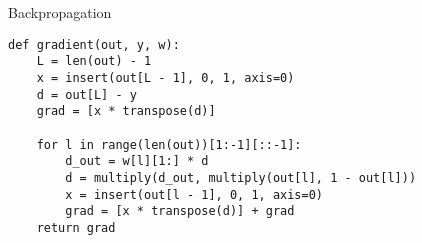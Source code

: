 \begin{frame}[fragile]
  \begin{block}{Backpropagation}
    \begin{lstlisting}
def gradient(out, y, w):
    L = len(out) - 1
    x = insert(out[L - 1], 0, 1, axis=0)
    d = out[L] - y
    grad = [x * transpose(d)]

    for l in range(len(out))[1:-1][::-1]:
        d_out = w[l][1:] * d
        d = multiply(d_out, multiply(out[l], 1 - out[l]))
        x = insert(out[l - 1], 0, 1, axis=0)
        grad = [x * transpose(d)] + grad
    return grad
    \end{lstlisting}
  \end{block}
\end{frame}
